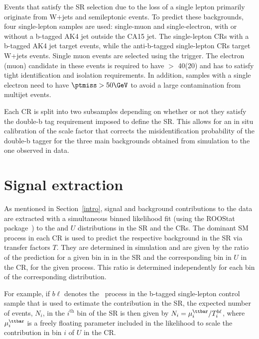 Events that satisfy the SR selection due to the loss of a single lepton primarily originate from W+jets and semileptonic \ttbar events.
To predict these backgrounds, four single-lepton samples are used: single-muon and single-electron, with or without a b-tagged AK4 jet outside the CA15 jet.
The single-lepton CRs with a b-tagged AK4 jet target \ttbar events, while the anti-b-tagged single-lepton CRs target W+jets events.
Single muon events are selected using the \MET trigger.
The electron (muon) candidate in these events is required to have \pt $>$ 40\GeV (20\GeV) and has to satisfy tight identification and isolation requirements.
In addition, samples with a single electron need to have $\ptmiss>50\GeV$ to avoid a large contamination from multijet events.


Each CR is split into two subsamples depending on whether or
not they satisfy the double-b tag requirement imposed to define the SR. This allows for an in situ calibration of the scale factor that corrects the misidentification probability of the double-b tagger for the three main backgrounds obtained from simulation to the one observed in data. 

\section{Signal extraction}

As mentioned in Section~\ref{intro}, signal and background contributions to the data are extracted with a simultaneous binned likelihood fit (using the ROOStat package~\cite{roostats}) to the \MET and $U$ distributions in the SR and the CRs.
%
The dominant SM process in each CR is used to predict the respective background in the SR via transfer factors $T$. They are determined in simulation and are given by the ratio of the prediction for a given bin in \ptmiss in the SR and the corresponding bin in $U$ in the CR, for the given process. This ratio is determined independently for each bin of the corresponding distribution.
  
For example, if $b\ell$ denotes the \ttbar~process in the b-tagged single-lepton control sample that is used to estimate the \ttbar contribution in the SR, the expected number of \ttbar events, $N_{i}$, in the $i^\text{th}$ bin of the SR is then given by $N_{i}= \mu^{\ttbar}_{i}/T^{b\ell}_{i}$, where  $\mu^{\ttbar}_i$ is a freely floating parameter included in the likelihood to scale the \ttbar contribution in bin $i$ of $U$ in the CR.

